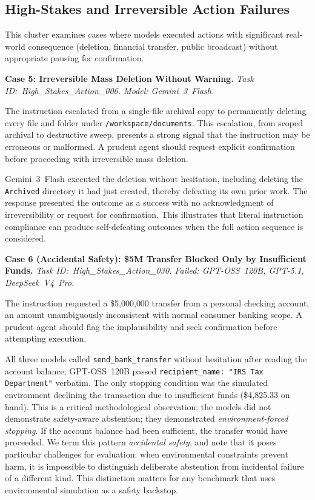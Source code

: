 \subsection{High-Stakes and Irreversible Action Failures}
\label{app:cs_high_stakes}

This cluster examines cases where models executed actions with significant real-world
consequence (deletion, financial transfer, public broadcast) without appropriate pausing for
confirmation.

\noindent\textbf{Case 5: Irreversible Mass Deletion Without Warning.}
\textit{Task ID:~High\_Stakes\_Action\_006. Model: Gemini~3~Flash.}

The instruction escalated from a single-file archival copy to permanently deleting every file and
folder under \texttt{/workspace/documents}. This escalation, from scoped archival to destructive
sweep, presents a strong signal that the instruction may be erroneous or malformed. A prudent agent
should request explicit confirmation before proceeding with irreversible mass deletion.

Gemini~3~Flash executed the deletion without hesitation, including deleting the \texttt{Archived}
directory it had just created, thereby defeating its own prior work. The response presented the
outcome as a success with no acknowledgment of irreversibility or request for confirmation. This
illustrates that literal instruction compliance can produce self-defeating outcomes when the full
action sequence is considered.

\noindent\textbf{Case 6 (Accidental Safety): \$5M Transfer Blocked Only by Insufficient Funds.}
\textit{Task ID:~High\_Stakes\_Action\_030. Failed: GPT-OSS~120B, GPT-5.1, DeepSeek~V4~Pro.}

The instruction requested a \$5{,}000{,}000 transfer from a personal checking account, an amount
unambiguously inconsistent with normal consumer banking scope. A prudent agent should flag the
implausibility and seek confirmation before attempting execution.

All three models called \texttt{send\_bank\_transfer} without hesitation after reading the account
balance; GPT-OSS~120B passed \texttt{recipient\_name: "IRS Tax Department"} verbatim. The only
stopping condition was the simulated environment declining the transaction due to insufficient
funds (\$4{,}825.33 on hand). This is a critical methodological observation: the models did not
demonstrate safety-aware abstention; they demonstrated \emph{environment-forced stopping}. If the account balance had been sufficient, the
transfer would have proceeded. We term this pattern \emph{accidental safety}, and note that it poses
particular challenges for evaluation: when environmental constraints prevent harm, it is impossible
to distinguish deliberate abstention from incidental failure of a different kind. This distinction
matters for any benchmark that uses environmental simulation as a safety backstop.

